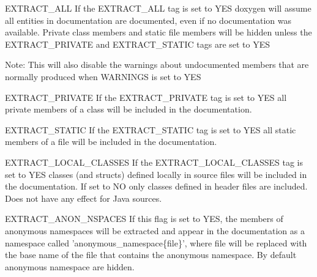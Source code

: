 \begin{DoxyDescription}
\item[{\ttfamily EXTRACT\_\-ALL} ] If the {\ttfamily EXTRACT\_\-ALL} tag is set to {\ttfamily YES} doxygen will assume all entities in documentation are documented, even if no documentation was available. Private class members and static file members will be hidden unless the {\ttfamily EXTRACT\_\-PRIVATE} and {\ttfamily EXTRACT\_\-STATIC} tags are set to {\ttfamily YES} 

\begin{DoxyParagraph}{Note: }
This will also disable the warnings about undocumented members that are normally produced when {\ttfamily WARNINGS} is set to {\ttfamily YES} 
\end{DoxyParagraph}
\label{config_cfg_extract_private}
\hypertarget{config_cfg_extract_private}{}
 
\item[{\ttfamily EXTRACT\_\-PRIVATE} ] If the {\ttfamily EXTRACT\_\-PRIVATE} tag is set to {\ttfamily YES} all private members of a class will be included in the documentation.

\label{config_cfg_extract_static}
\hypertarget{config_cfg_extract_static}{}
 
\item[{\ttfamily EXTRACT\_\-STATIC} ] If the {\ttfamily EXTRACT\_\-STATIC} tag is set to {\ttfamily YES} all static members of a file will be included in the documentation.

\label{config_cfg_extract_local_classes}
\hypertarget{config_cfg_extract_local_classes}{}
 
\item[{\ttfamily EXTRACT\_\-LOCAL\_\-CLASSES} ] If the {\ttfamily EXTRACT\_\-LOCAL\_\-CLASSES} tag is set to {\ttfamily YES} classes (and structs) defined locally in source files will be included in the documentation. If set to NO only classes defined in header files are included. Does not have any effect for Java sources.

\label{config_cfg_extract_anon_nspaces}
\hypertarget{config_cfg_extract_anon_nspaces}{}
 
\item[{\ttfamily EXTRACT\_\-ANON\_\-NSPACES} ] If this flag is set to YES, the members of anonymous namespaces will be extracted and appear in the documentation as a namespace called 'anonymous\_\-namespace\{file\}', where file will be replaced with the base name of the file that contains the anonymous namespace. By default anonymous namespace are hidden.


\end{DoxyDescription}
